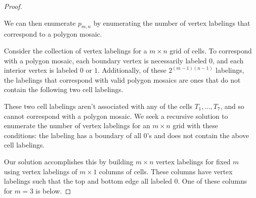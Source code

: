 \begin{proof}
\begin{center}
\end{center}

We can then enumerate $p_{m,n}$ by enumerating the number of vertex labelings that correspond to a polygon mosaic. 

Consider the collection of vertex labelings for a $m \times n$ grid of cells. To correspond with a polygon mosaic, each boundary vertex is necessarily labeled $0$, and each interior vertex is labeled $0$ or $1$. Additionally, of these $2^{(m-1)(n-1)}$ labelings, the labelings that correspond with valid polygon mosaics are ones that do not contain the following two cell labelings.

\begin{center}
\end{center}

These two cell labelings aren't associated with any of the cells $T_1, \dots, T_7$, and so cannot correspond with a polygon mosaic. We seek a recursive solution to enumerate the number of vertex labelings for an $m \times n$ grid with these  conditions: the labeling has a boundary of all $0$'s and does not contain the above cell labelings. 

Our solution accomplishes this by building $m \times n$ vertex labelings for fixed $m$ using vertex labelings of $m \times 1$ columns of cells. These columns have vertex labelings such that the top and bottom edge all labeled $0$. One of these columns for $m=3$ is below.


\end{proof}
